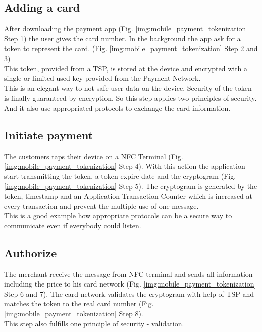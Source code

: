 \subsection{Adding a card}
\label{chp:example:sec:googlePay:ssec:addingACard}

After downloading the payment app (Fig. \ref{img:mobile_payment_tokenization} Step 1) the user gives the card number. In the background the app ask for a token to represent the card. (Fig. \ref{img:mobile_payment_tokenization} Step 2 and 3)\\
This token, provided from a TSP, is stored at the device and encrypted with a single or limited used key provided from the Payment Network. \\
This is an elegant way to not safe user data on the device. Security of the token is finally guaranteed by encryption. So this step applies two principles of security. And it also use appropriated protocols to exchange the card information.

\subsection{Initiate payment}
\label{chp:example:sec:googlePay:ssec:initiate}

The customers taps their device on a NFC Terminal (Fig. \ref{img:mobile_payment_tokenization} Step 4). With this action the application start transmitting the token, a token expire date and the cryptogram (Fig. \ref{img:mobile_payment_tokenization} Step 5). The cryptogram is generated by the token, timestamp and an Application Transaction Counter which is increased at every transaction and prevent the multiple use of one message.\\
This is a good example how appropriate protocols can be a secure way to communicate even if everybody could listen.\\

\subsection{Authorize}
\label{chp:example:sec:googlePay:ssec:authorize}

The merchant receive the message from NFC terminal and sends all information including the price to his card network (Fig. \ref{img:mobile_payment_tokenization} Step 6 and 7). The card network validates the cryptogram with help of TSP and matches the token to the real card number (Fig. \ref{img:mobile_payment_tokenization} Step 8).
\\
This step also fulfills one principle of security - validation.

